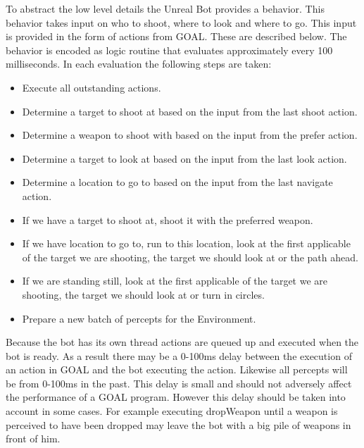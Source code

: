 \documentclass[11pt,a4paper]{article}
\begin{document}


To abstract the low level details the Unreal Bot provides a behavior. This behavior takes input on who to shoot, where to look and where to go. This input is provided in the form of actions from GOAL. These are described below. The behavior is encoded as logic routine that evaluates approximately every 100 milliseconds. In each evaluation the following steps are taken:

\begin{itemize}
	\item Execute all outstanding actions.
	\item Determine a target to shoot at based on the input from the last shoot action.
	\item Determine a weapon to shoot with based on the input from the prefer action.
	\item Determine a target to look at based on the input from the last look action.
	\item Determine a location to go to based on the input from the last navigate action.
	\item If we have a target to shoot at,  shoot it with the preferred weapon.
	\item If we have location to go to, run to this location, look at the first applicable of the target we are shooting, the target we should look at or the path ahead.
 	\item If we are standing still, look at the first applicable of the target we are shooting, the target we should look at or turn in circles.
	\item Prepare a new batch of percepts for the Environment.
\end{itemize}


Because the bot has its own thread actions are queued up and executed when the bot is ready. As a result there may be a 0-100ms delay between the execution of an action in GOAL and the bot executing the action. Likewise all percepts will be from 0-100ms in the past. This delay is small and should not adversely affect the performance of a GOAL program. However this delay should be taken into account in some cases. For example executing dropWeapon until a weapon is perceived to have been dropped may leave the bot with a big pile of weapons in front of him.
\end{document}

